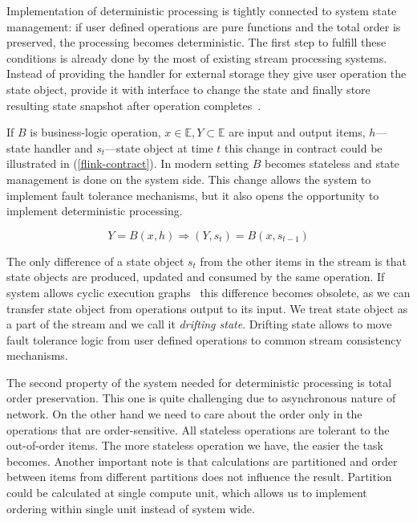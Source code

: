 
\label{motivation-section}

Implementation of deterministic processing is tightly connected to system state management: if user defined operations are pure functions and the total order is preserved, the processing becomes deterministic. The first step to fulfill these conditions is already done by the most of existing stream processing systems. Instead of providing the handler for external storage they give user operation the state object, provide it with interface to change the state and finally store resulting state snapshot after operation completes~\cite{carbone2015apache, apache:storm, Noghabi:2017:SSS:3137765.3137770}.

If $B$ is business-logic operation, $x \in \mathbb{E}, Y \subset \mathbb{E}$ are input and output items, $h$---state handler and $s_t$---state object at time $t$ this change in contract could be illustrated in (\ref{flink-contract}). In modern setting $B$ becomes stateless and state management is done on the system side. This change allows the system to implement fault tolerance mechanisms, but it also opens the opportunity to implement deterministic processing.

\begin{equation}
\label{flink-contract}
Y = B(x, h) \Rightarrow (Y, s_t) = B(x, s_{t-1}) 
\end{equation}

The only difference of a state object $s_t$ from the other items in the stream is that state objects are produced, updated and consumed by the same operation. If system allows cyclic execution graphs~\cite{Murray:2013:NTD:2517349.2522738} this difference becomes obsolete, as we can transfer state object from operations output to its input. We treat state object as a part of the stream and we call it {\it drifting state}. Drifting state allows to move fault tolerance logic from user defined operations to common stream consistency mechanisms.

The second property of the system needed for deterministic processing is total order preservation. This one is quite challenging due to asynchronous nature of network. On the other hand we need to care about the order only in the operations that are order-sensitive. All stateless operations are tolerant to the out-of-order items. The more stateless operation we have, the easier the task becomes. Another important note is that calculations are partitioned and order between items from different partitions does not influence the result. Partition could be calculated at single compute unit, which allows us to implement ordering within single unit instead of system wide.

